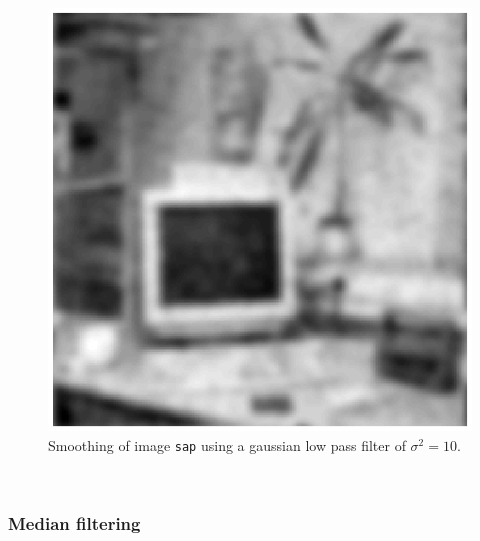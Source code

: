 \begin{minipage}{\linewidth}
\begin{minipage}{0.4\linewidth}
\begin{figure}[H]
      \includegraphics[scale=0.6]{./images/Q17/discgaussfft/sap_10.eps}
      \caption{Smoothing of image \texttt{sap} using a gaussian low pass filter of $\sigma^2 = 10$.}
      \label{fig:Q17_discgaussfft_sap_10}
    \end{figure}
  \end{minipage}
\end{minipage}
\\



\subsubsection{Median filtering}

